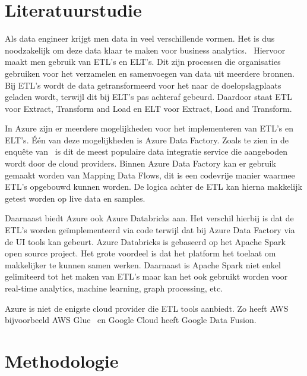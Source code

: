 \section{Literatuurstudie}%
\label{sec:literatuurstudie}

Als data engineer krijgt men data in veel verschillende vormen. Het is dus noodzakelijk om deze data klaar te maken voor business analytics.~\autocite{Kromer2022} Hiervoor maakt men gebruik van ETL's en ELT's. Dit zijn processen die organisaties gebruiken voor het verzamelen en samenvoegen van data uit meerdere bronnen. Bij ETL's wordt de data getransformeerd voor het naar de doelopslagplaats geladen wordt, terwijl dit bij ELT's pas achteraf gebeurd. Daardoor staat ETL voor Extract, Transform and Load en ELT voor Extract, Load and Transform.~\autocite{Bartley2023} 

In Azure zijn er meerdere mogelijkheden voor het implementeren van ETL's en ELT's. Één van deze mogelijkheden is Azure Data Factory. Zoals te zien in de enquête van~\textcite{Sreemathy2021} is dit de meest populaire data integratie service die aangeboden wordt door de cloud providers. Binnen Azure Data Factory kan er gebruik gemaakt worden van Mapping Data Flows, dit is een codevrije manier waarmee ETL's opgebouwd kunnen worden. De logica achter de ETL kan hierna makkelijk getest worden op live data en samples.~\autocite{Kromer2022a} 

Daarnaast biedt Azure ook Azure Databricks aan. Het verschil hierbij is dat de ETL's worden geïmplementeerd via code terwijl dat bij Azure Data Factory via de UI tools kan gebeurt. Azure Databricks is gebaseerd op het Apache Spark open source project. Het grote voordeel is dat het platform het toelaat om makkelijker te kunnen samen werken. Daarnaast is Apache Spark niet enkel gelimiteerd tot het maken van ETL's maar kan het ook gebruikt worden voor real-time analytics, machine learning, graph processing, etc.~\autocite{Etaati2019}

Azure is niet de enigste cloud provider die ETL tools aanbiedt. Zo heeft AWS bijvoorbeeld AWS Glue~\autocite{Khan2024} en Google Cloud heeft Google Data Fusion.~\autocite{Jaiswal2022}

\section{Methodologie}%
\label{sec:methodologie}

